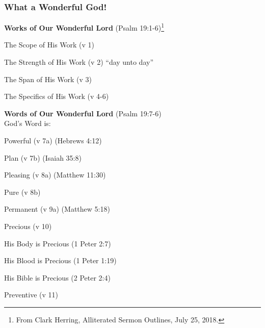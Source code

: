 \subsubsection{What a Wonderful God!}

\begin{compactenum}[I.]
    \item \textbf{Works of Our Wonderful Lord}   (Psalm 19:1-6)\footnote{From Clark Herring, Alliterated Sermon Outlines, July 25, 2018.}
    \begin{compactenum}[A.]
    	\item The Scope of His Work (v 1)
    	\item The Strength of His Work (v 2) ``day unto day''
    	\item The Span of His Work (v 3)
    	\item The Specifics of His Work (v 4-6)
	\end{compactenum}
    \item \textbf{Words of Our Wonderful Lord}   (Psalm 19:7-6)\\God's Word is:
    \begin{compactenum}[A.]
    	\item Powerful (v 7a)  (Hebrews 4:12)
    	\item Plan (v 7b)  (Isaiah 35:8)
    	\item Pleasing (v 8a)  (Matthew 11:30)
    	\item Pure (v 8b)
    	\item Permanent (v 9a)  (Matthew 5:18)
    	\item Precious (v 10)
    	   \begin{compactenum}[1.]
    	    \item His Body is Precious  (1 Peter 2:7)
    	    \item His Blood is Precious  (1 Peter 1:19) 
    	    \item His Bible is Precious  (2 Peter 2:4)
    	\end{compactenum}
    	\item Preventive (v 11)

\end{compactenum}
\end{compactenum}
